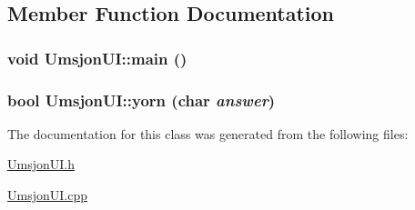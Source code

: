 \subsection{Member Function Documentation}
\hypertarget{class_umsjon_u_i_ea83b916b3f52eec32ae6d54d59b4453}{
\subsubsection[main]{\setlength{\rightskip}{0pt plus 5cm}void Umsjon\-UI::main ()}}
\label{class_umsjon_u_i_ea83b916b3f52eec32ae6d54d59b4453}


\hypertarget{class_umsjon_u_i_e1489f835e125c37fb30e595797d971d}{
\subsubsection[yorn]{\setlength{\rightskip}{0pt plus 5cm}bool Umsjon\-UI::yorn (char {\em answer})}}
\label{class_umsjon_u_i_e1489f835e125c37fb30e595797d971d}




The documentation for this class was generated from the following files:\begin{CompactItemize}
\item 
\hyperlink{_umsjon_u_i_8h}{Umsjon\-UI.h}\item 
\hyperlink{_umsjon_u_i_8cpp}{Umsjon\-UI.cpp}\end{CompactItemize}
